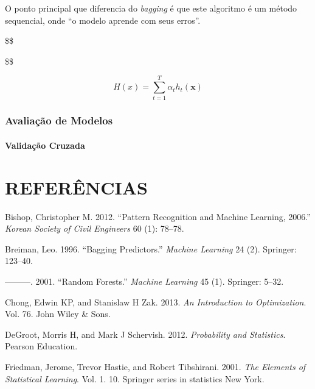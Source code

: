 \documentclass[
	12pt,				%
	a4paper,		%
	oneside,    %
	chapter=TITLE,		   %
	section=TITLE,		   %
	subsection=TITLE,	   %
	subsubsection=TITLE, %
	english,			%
	french,				%
	spanish,			%
	brazil,				%
]{abntex2}
\begin{document}
O ponto principal que diferencia do \emph{bagging} é que este algoritmo
é um método sequencial, onde ``o modelo aprende com seus erros''.

\$\$

\$\$

\[
H(x) = \sum_{t=1}^T{\alpha_th_t(\boldsymbol{x})}
\]

\hypertarget{avaliauxe7uxe3o-de-modelos}{%
\subsection{Avaliação de Modelos}\label{avaliauxe7uxe3o-de-modelos}}

\hypertarget{validauxe7uxe3o-cruzada}{%
\subsubsection{Validação Cruzada}\label{validauxe7uxe3o-cruzada}}

\newpage

\hypertarget{referuxeancias}{%
\chapter*{REFERÊNCIAS}\label{referuxeancias}}

\hypertarget{refs}{}
\leavevmode\hypertarget{ref-bishop2012pattern}{}%
Bishop, Christopher M. 2012. ``Pattern Recognition and Machine Learning,
2006.'' \emph{Korean Society of Civil Engineers} 60 (1): 78--78.

\leavevmode\hypertarget{ref-breiman1996bagging}{}%
Breiman, Leo. 1996. ``Bagging Predictors.'' \emph{Machine Learning} 24
(2). Springer: 123--40.

\leavevmode\hypertarget{ref-breiman2001random}{}%
---------. 2001. ``Random Forests.'' \emph{Machine Learning} 45 (1).
Springer: 5--32.

\leavevmode\hypertarget{ref-chong2013introduction}{}%
Chong, Edwin KP, and Stanislaw H Zak. 2013. \emph{An Introduction to
Optimization}. Vol. 76. John Wiley \& Sons.

\leavevmode\hypertarget{ref-degroot2012probability}{}%
DeGroot, Morris H, and Mark J Schervish. 2012. \emph{Probability and
Statistics}. Pearson Education.

\leavevmode\hypertarget{ref-friedman2001elements}{}%
Friedman, Jerome, Trevor Hastie, and Robert Tibshirani. 2001. \emph{The
Elements of Statistical Learning}. Vol. 1. 10. Springer series in
statistics New York.
\end{document}
